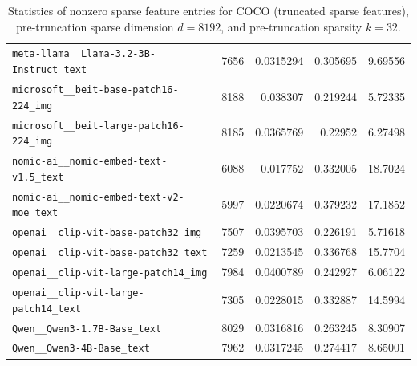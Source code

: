 \begin{table}[htbp]
{\begin{tabular}{lrrrr}
\texttt{meta-llama\_\_Llama-3.2-3B-Instruct\_text} & 7656 & 0.0315294 & 0.305695 & 9.69556 \\
\texttt{microsoft\_\_beit-base-patch16-224\_img} & 8188 & 0.038307 & 0.219244 & 5.72335 \\
\texttt{microsoft\_\_beit-large-patch16-224\_img} & 8185 & 0.0365769 & 0.22952 & 6.27498 \\
\texttt{nomic-ai\_\_nomic-embed-text-v1.5\_text} & 6088 & 0.017752 & 0.332005 & 18.7024 \\
\texttt{nomic-ai\_\_nomic-embed-text-v2-moe\_text} & 5997 & 0.0220674 & 0.379232 & 17.1852 \\
\texttt{openai\_\_clip-vit-base-patch32\_img} & 7507 & 0.0395703 & 0.226191 & 5.71618 \\
\texttt{openai\_\_clip-vit-base-patch32\_text} & 7259 & 0.0213545 & 0.336768 & 15.7704 \\
\texttt{openai\_\_clip-vit-large-patch14\_img} & 7984 & 0.0400789 & 0.242927 & 6.06122 \\
\texttt{openai\_\_clip-vit-large-patch14\_text} & 7305 & 0.0228015 & 0.332887 & 14.5994 \\
\texttt{Qwen\_\_Qwen3-1.7B-Base\_text} & 8029 & 0.0316816 & 0.263245 & 8.30907 \\
\texttt{Qwen\_\_Qwen3-4B-Base\_text} & 7962 & 0.0317245 & 0.274417 & 8.65001 \\
\bottomrule
\end{tabular}
}%
\caption{Statistics of nonzero sparse feature entries for COCO (truncated sparse features), pre-truncation sparse dimension $d=8192$, and pre-truncation sparsity $k=32$.}
\label{tab:sparse-feature-entries-coco-truncated-d8192-k32}
\end{table}
